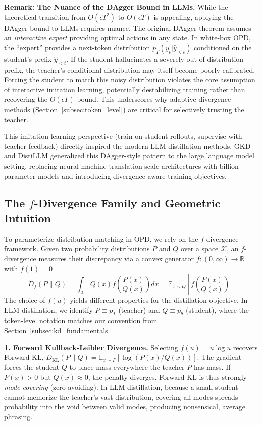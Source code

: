 \documentclass{article} %
\newcommand{\KL}{D_{\mathrm{KL}}}
\newcommand{\ptheta}{p_\theta}
\newcommand{\pteacher}{p_T}
\begin{document}
\textbf{Remark: The Nuance of the DAgger Bound in LLMs.} While the theoretical transition from $O(\epsilon T^2)$ to $O(\epsilon T)$ is appealing, applying the DAgger bound to LLMs requires nuance. The original DAgger theorem assumes an \textit{interactive expert} providing optimal actions in any state. In white-box OPD, the ``expert'' provides a next-token distribution $\pteacher(y_t | \hat{y}_{<t})$ conditioned on the student's prefix $\hat{y}_{<t}$. If the student hallucinates a severely out-of-distribution prefix, the teacher's conditional distribution may itself become poorly calibrated. Forcing the student to match this noisy distribution violates the core assumption of interactive imitation learning, potentially destabilizing training rather than recovering the $O(\epsilon T)$ bound. This underscores why adaptive divergence methods (Section~\ref{subsec:token_level}) are critical for selectively trusting the teacher.

This imitation learning perspective (train on student rollouts, supervise with teacher feedback) directly inspired the modern LLM distillation methods. GKD \citep{2306.13649} and DistiLLM \citep{2402.03898} generalized this DAgger-style pattern to the large language model setting, replacing neural machine translation-scale architectures with billion-parameter models and introducing divergence-aware training objectives.


\subsection{The $f$-Divergence Family and Geometric Intuition}
\label{subsec:f_divergence}

To parameterize distribution matching in OPD, we rely on the $f$-divergence framework. Given two probability distributions $P$ and $Q$ over a space $\mathcal{X}$, an $f$-divergence measures their discrepancy via a convex generator $f: (0, \infty) \to \mathbb{R}$ with $f(1) = 0$
\begin{equation}
    D_f(P \parallel Q) = \int_{\mathcal{X}} Q(x) f\left(\frac{P(x)}{Q(x)}\right) dx = \mathbb{E}_{x \sim Q} \left[ f\left(\frac{P(x)}{Q(x)}\right) \right]
\end{equation}
The choice of $f(u)$ yields different properties for the distillation objective. In LLM distillation, we identify $P \equiv \pteacher$ (teacher) and $Q \equiv \ptheta$ (student), where the token-level notation matches our convention from Section~\ref{subsec:kd_fundamentals}.

\textbf{1. Forward Kullback-Leibler Divergence.} Selecting $f(u) = u \log u$ recovers Forward KL, $\KL(P \parallel Q) = \mathbb{E}_{x \sim P} [ \log(P(x)/Q(x)) ]$. The gradient forces the student $Q$ to place mass everywhere the teacher $P$ has mass. If $P(x) > 0$ but $Q(x) \approx 0$, the penalty diverges. Forward KL is thus strongly \textit{mode-covering} (zero-avoiding). In LLM distillation, because a small student cannot memorize the teacher's vast distribution, covering all modes spreads probability into the void between valid modes, producing nonsensical, average phrasing.
\end{document}
